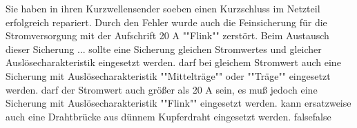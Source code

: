     {Sie haben in ihren Kurzwellensender soeben einen Kurzschluss im Netzteil erfolgreich repariert. Durch den Fehler wurde auch die Feinsicherung für die Stromversorgung mit der Aufschrift 20 A ""Flink"" zerstört. Beim Austausch dieser Sicherung ...}
    {sollte eine Sicherung gleichen Stromwertes und gleicher Auslösecharakteristik eingesetzt werden.}
    {darf bei gleichem Stromwert auch eine Sicherung mit Auslösecharakteristik ""Mittelträge"" oder ""Träge"" eingesetzt werden.}
    {darf der Stromwert auch größer als 20 A sein, es muß jedoch eine Sicherung mit Auslösecharakteristik ""Flink"" eingesetzt werden.}
    {kann ersatzweise auch eine Drahtbrücke aus dünnem Kupferdraht eingesetzt werden.}
    {false}{false}